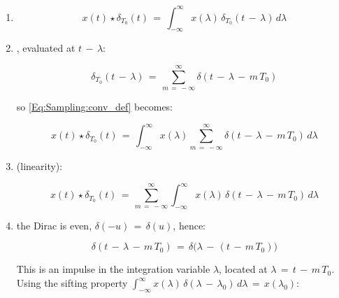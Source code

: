 \begin{enumerate}

\item {}

\begin{equation}
x(t) \star \delta_{T_0}(t) \, = \, \int_{-\infty}^{\infty} x(\lambda) \, \delta_{T_0}(t \, - \, \lambda) \, d\lambda
\label{Eq:Sampling:conv_def}
\end{equation}

\item {}, evaluated at $t \, - \, \lambda$:

\begin{equation}
\delta_{T_0}(t \, - \, \lambda) \, = \, \sum_{m \, = \, -\infty}^{\infty} \delta(t \, - \, \lambda \, - \, m \, T_0)
\label{Eq:Sampling:conv_train_shifted}
\end{equation}

so \autoref{Eq:Sampling:conv_def} becomes:

\begin{equation}
x(t) \star \delta_{T_0}(t) \, = \, \int_{-\infty}^{\infty} x(\lambda) \sum_{m \, = \, -\infty}^{\infty} \delta(t \, - \, \lambda \, - \, m \, T_0) \, d\lambda
\label{Eq:Sampling:conv_substituted}
\end{equation}

\item {} (linearity):

\begin{equation}
x(t) \star \delta_{T_0}(t) \, = \, \sum_{m \, = \, -\infty}^{\infty} \int_{-\infty}^{\infty} x(\lambda) \, \delta(t \, - \, \lambda \, - \, m \, T_0) \, d\lambda
\label{Eq:Sampling:conv_swapped}
\end{equation}

\item {} the Dirac is even, $\delta(-u) \, = \, \delta(u)$, hence:

\begin{equation}
\delta(t \, - \, \lambda \, - \, m \, T_0) \, = \, \delta\big(\lambda \, - \, (t \, - \, m \, T_0)\big)
\end{equation}

This is an impulse in the integration variable $\lambda$, located at $\lambda \, = \, t \, - \, m \, T_0$. Using the sifting property $\displaystyle\int_{-\infty}^{\infty} x(\lambda) \, \delta(\lambda \, - \, \lambda_0) \, d\lambda \, = \, x(\lambda_0)$:


\end{enumerate}
